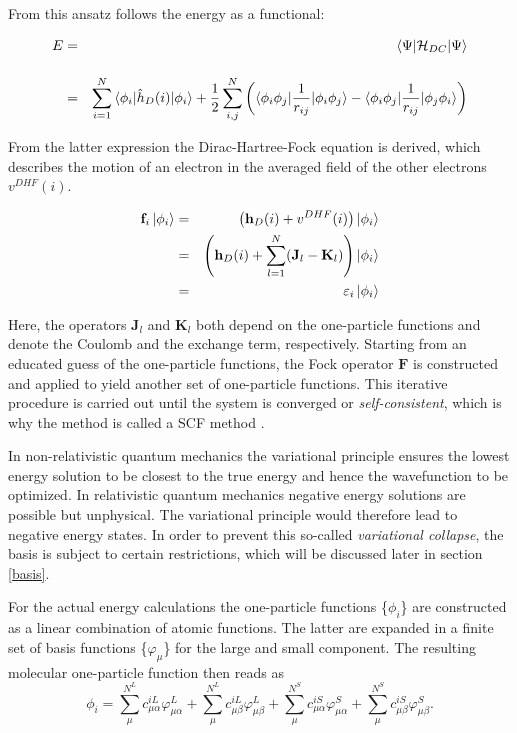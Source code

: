 From this ansatz follows the energy as a functional:

\begin{eqnarray}
  E &=& \braket{\Psi|\mathcal{H}_{DC}|\Psi}\\\vphantom{\rule{0pt}{30pt}}
  &=& \sum\limits_{i=1}^N\braket{\phi_i|\hat{h}_D(i)|\phi_i}  + \frac12 \sum\limits_{i,j}^N\left(\braket{\phi_i\phi_j|\frac1{r_{ij}}|\phi_i\phi_j} - \braket{\phi_i\phi_j|\frac1{r_{ij}}|\phi_j\phi_i}\right)
\end{eqnarray}

From the latter expression the Dirac-Hartree-Fock equation is derived, which
describes the motion of an electron in the averaged field of the other
electrons $v^{DHF}(i)$.

\begin{eqnarray}
\mathbf{f}_i\ket{\phi_i} &=& \left(\mathbf{h}_D(i) + v^{DHF}(i)\right)\ket{\phi_i}\\
                         &=& \left( \mathbf{h}_D(i) + \sum\limits_{l=1}^{N}(\mathbf{J}_l-\mathbf{K}_l)\right)\ket{\phi_i}\\
                         &=& \varepsilon_i\ket{\phi_i}
\end{eqnarray}

Here, the operators $\mathbf{J}_l$ and $\mathbf{K}_l$ both depend on the
one-particle functions and denote the Coulomb and the
exchange term, respectively.
Starting from an educated guess of the one-particle functions, the Fock operator
$\mathbf{F}$ is constructed and applied to yield another set of one-particle
functions. This iterative procedure is carried out until the system is
converged or \emph{self-consistent}, which is why the method is called a
\ac{SCF} method \cite{szabo}.

In non-relativistic quantum mechanics the variational principle ensures the
lowest energy solution to be closest to the true energy and hence the wavefunction
to be optimized. In relativistic quantum mechanics negative energy solutions
are possible but unphysical. The variational principle would therefore lead to
negative energy states. In order to prevent this so-called \emph{variational collapse},
the basis is subject to certain restrictions, which will be discussed later in
section \ref{basis}.
 
For the actual energy calculations the one-particle functions \{$\phi_i$\}
are constructed as a linear combination of atomic functions. The latter are
expanded in a finite set of basis functions \{$\varphi_\mu$\} for the large and small
component. The resulting molecular one-particle function then reads as
\begin{equation}
\phi_i = \sum\limits_\mu^{N^L} c_{\mu\alpha}^{iL} \varphi_{\mu\alpha}^L +  \sum\limits_\mu^{N^L} c_{\mu\beta}^{iL} \varphi_{\mu\beta}^L + \sum\limits_\mu^{N^S} c_{\mu\alpha}^{iS} \varphi_{\mu\alpha}^S + \sum\limits_\mu^{N^S} c_{\mu\beta}^{iS} \varphi_{\mu\beta}^S.
\end{equation}

